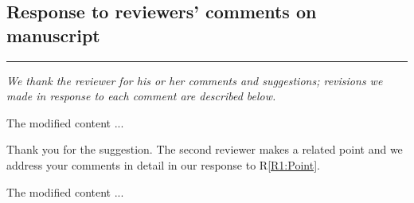 \documentclass[12pt]{article}
\begin{document}
\pagewiselinenumbers

\begin{center}
	\section*{\Huge Response to reviewers’ comments on manuscript}	
\end{center}

\hrule



%
%
%

\hspace{2cm}



\reviewersection

\textit{We thank the reviewer for his or her comments and suggestions;
revisions we made in response to each comment are described below.}

\begin{comment}
	\lipsum[2]
	\label{R1:Point}
\end{comment}

\begin{response}
	\lipsum[3]
\end{response}

\begin{recompose}
	The modified content ...
\end{recompose}  

\begin{comment}
	\lipsum[11]
\end{comment}

\begin{response}
Thank you for the suggestion. The second reviewer makes a related point and we address your comments in detail in our response to R\ref{R1:Point}.
\end{response}

\begin{recompose}
	The modified content ...
\end{recompose} 

\clearpage

\reviewersection
\end{document}

